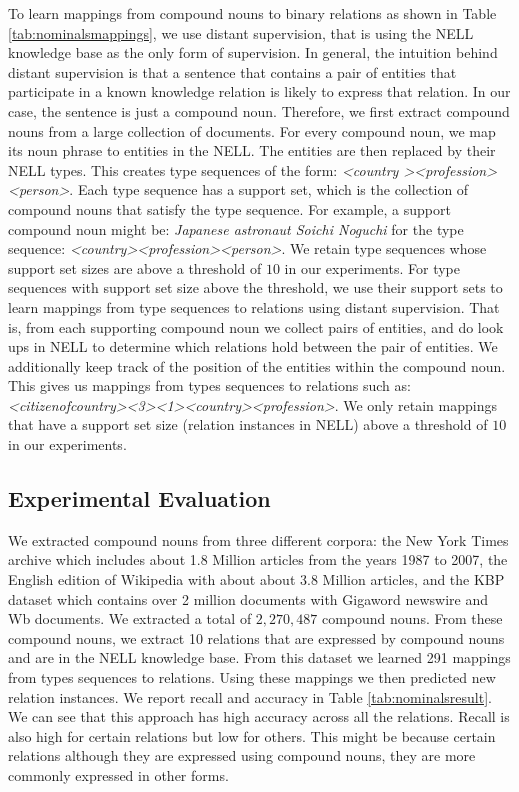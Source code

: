 To learn  mappings from  compound nouns to binary relations as shown in Table \ref{tab:nominalsmappings}, we  use  distant supervision, that is using the NELL knowledge base as the only form of supervision.   In general, the intuition behind
 distant supervision is that a sentence that contains a pair of entities that participate in a known
knowledge relation is likely to express that relation. In our case, the sentence is just a compound noun. Therefore, we first extract compound nouns from a large collection of documents.  For every compound noun,  we map its noun phrase to entities in the NELL. The entities are then replaced by their NELL types. This creates  type sequences of the form:  \textit{\textless country \textgreater \textless profession\textgreater \textless person\textgreater}.  Each type sequence has a support set, which is the collection of  compound nouns that satisfy the type sequence. For example, a support compound noun might be: \textit{Japanese	astronaut	Soichi Noguchi}   for the type sequence: \textit{\textless country\textgreater \textless profession\textgreater \textless person\textgreater}.  We retain type sequences whose support set sizes are above a threshold of  $10$ in our experiments.  For  type sequences with support set size above the threshold, we use their support sets to learn mappings from type sequences to relations using distant supervision.  That is, from each supporting compound noun we collect pairs of entities, and do look ups in NELL to determine which relations hold between the pair of entities. We additionally keep track of the position of  the entities within the compound noun. This gives us mappings from types sequences to relations such as:  \textit{\textless citizenofcountry\textgreater \textless3\textgreater  \textless1\textgreater \textless country\textgreater \textless profession\textgreater}. We only retain mappings that have a support set size (relation instances in NELL) above a threshold of $10$ in our experiments.

\subsection{Experimental Evaluation}
We extracted compound nouns from three different corpora: the New York
Times archive which includes about 1.8 Million
 articles from the years 1987 to 2007, the English edition of Wikipedia  with about
about 3.8 Million articles, and the KBP dataset \cite{conf/tac/Surdeanu13} which contains over 2 million documents with  Gigaword newswire  and Wb documents. We extracted a total of $2,270,487$ compound nouns.
From these compound nouns, we  extract 10 relations that are expressed by compound nouns and are in the NELL knowledge base. From this dataset we learned 291 mappings from  types sequences to relations.  Using these mappings we then predicted new relation instances. We report  recall and accuracy   in  Table \ref{tab:nominalsresult}. We can see that this approach has high accuracy across all the relations. Recall is also high for certain relations but low for others. This might be because  certain relations although they are expressed using compound nouns, they are more commonly expressed in other forms.

